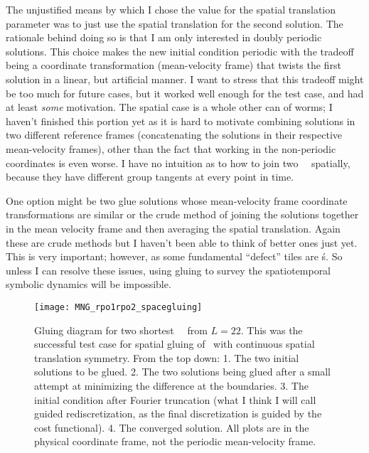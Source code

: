 \begin{description}
{\begin{description}
The unjustified means by which I chose the value for the spatial translation parameter was to just use
the spatial translation for the second solution. The rationale behind doing so is that I am only
interested in doubly periodic solutions. This choice makes the new initial
condition periodic with the tradeoff being a coordinate transformation (mean-velocity frame)
that twists the first solution in a linear, but artificial manner. I want to stress that
this tradeoff might be too much for future cases, but it worked well enough for the test
case, and had at least \emph{some} motivation. The spatial case is a whole other can of worms;
I haven't finished this portion yet as it is hard to motivate combining solutions in two different
reference frames (concatenating the solutions in their respective mean-velocity frames), other than
the fact that working in the non-periodic coordinates is even worse.
I have no intuition as to how to join two \rpo\ \twots\ spatially,
because they have different group tangents at every point in time.

One option might be two glue solutions whose mean-velocity frame coordinate transformations are
similar or the crude method of joining the solutions together in the mean velocity frame and then
averaging the spatial translation. Again these are crude methods but I haven't been able to think of better
ones just yet. This is very important; however, as some fundamental ``defect'' tiles are \rpo\'s. So unless
I can resolve these issues, using gluing to survey the spatiotemporal symbolic dynamics will be impossible.

\end{description}
}

\begin{figure}
\centering
\begin{minipage}[height=.1\textheight]{.8\textwidth}
\texttt{[image: MNG\_rpo1rpo2\_spacegluing]}
\end{minipage}
\caption{ \label{fig:MNG-rpo1plus2-space}
Gluing diagram for two shortest \rpo\ \twots\ from $L=22$. This was the successful
test case for spatial gluing of \twots\ with continuous spatial translation symmetry.
From the top down: 1. The two initial solutions to be glued. 2. The two solutions being
glued after a small attempt at minimizing the difference at the boundaries. 3. The
initial condition after Fourier truncation (what I think I will call guided rediscretization,
as the final discretization is guided by the cost functional). 4. The converged solution.
All plots are in the physical coordinate frame, not the periodic mean-velocity frame.
}
\end{figure}


\end{description}
